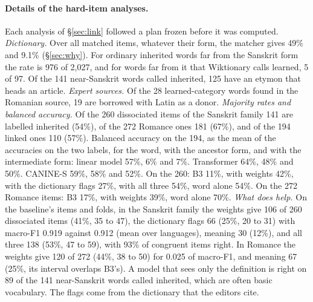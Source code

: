 \documentclass[11pt]{article}
\begin{document}
\paragraph{Details of the hard-item analyses.} Each analysis of \S\ref{sec:link} followed a plan frozen before it was computed. \textit{Dictionary.} Over all matched items, whatever their form, the matcher gives 49\% and 9.1\% (\S\ref{sec:why}). For ordinary inherited words far from the Sanskrit form the rate is 976 of 2,027, and for words far from it that Wiktionary calls learned, 5 of 97. Of the 141 near-Sanskrit words called inherited, 125 have an etymon that heads an article. \textit{Expert sources.} Of the 28 learned-category words found in the Romanian source, 19 are borrowed with Latin as a donor. \textit{Majority rates and balanced accuracy.} Of the 260 dissociated items of the Sanskrit family 141 are labelled inherited (54\%), of the 272 Romance ones 181 (67\%), and of the 194 linked ones 110 (57\%). Balanced accuracy on the 194, as the mean of the accuracies on the two labels, for the word, with the ancestor form, and with the intermediate form: linear model 57\%, 6\% and 7\%. Transformer 64\%, 48\% and 50\%. CANINE-S 59\%, 58\% and 52\%. On the 260: B3 11\%, with weights 42\%, with the dictionary flags 27\%, with all three 54\%, word alone 54\%. On the 272 Romance items: B3 17\%, with weights 39\%, word alone 70\%. \textit{What does help.} On the baseline's items and folds, in the Sanskrit family the weights give 106 of 260 dissociated items (41\%, 35 to 47), the dictionary flags 66 (25\%, 20 to 31) with macro-F1 0.919 against 0.912 (mean over languages), meaning 30 (12\%), and all three 138 (53\%, 47 to 59), with 93\% of congruent items right. In Romance the weights give 120 of 272 (44\%, 38 to 50) for 0.025 of macro-F1, and meaning 67 (25\%, its interval overlaps B3's). A model that sees only the definition is right on 89 of the 141 near-Sanskrit words called inherited, which are often basic vocabulary. The flags come from the dictionary that the editors cite.
\end{document}

